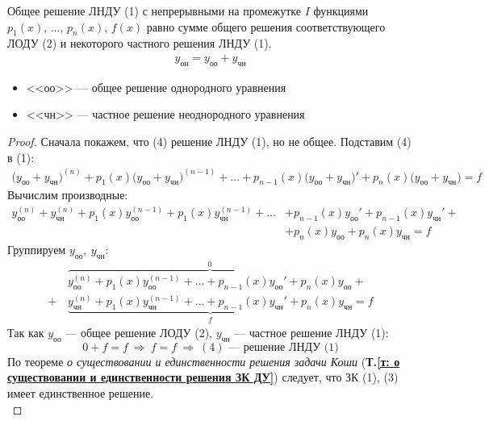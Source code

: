 \begin{theorem}
    Общее решение ЛНДУ (1) с непрерывными на промежутке $I$ функциями\break $p_1(x),\, \ldots,\, p_n(x),\, f(x)$ равно сумме общего решения соответствующего ЛОДУ (2) и некоторого частного решения ЛНДУ (1).
    \begin{gather}
        \boxed{y_{\text{он}} = y_{\text{оо}} + y_{\text{чн}}}
    \end{gather}
    \begin{itemize}
        \item <<оо>> --- общее решение однородного уравнения
        \item <<чн>> --- частное решение неоднородного уравнения
    \end{itemize}
\end{theorem}
\begin{proof}
    Сначала покажем, что (4) решение ЛНДУ (1), но не общее.
    Подставим (4) в (1):
    \begin{align*}
        \big(y_{\text{оо}} + y_{\text{чн}}\big)^{(n)} + p_1(x) \big(y_{\text{оо}} + y_{\text{чн}}\big)^{(n-1)} + \ldots + p_{n-1}(x) \big(y_{\text{оо}} + y_{\text{чн}}\big)' + p_n(x) \big(y_{\text{оо}} + y_{\text{чн}}\big) = f
    \end{align*}
    Вычислим производные:
    \begin{align*}
        y_{\text{оо}}^{(n)} + y_{\text{чн}}^{(n)} + p_1(x)y_{\text{оо}}^{(n-1)} + p_1(x) y_{\text{чн}}^{(n-1)} + \ldots &+ p_{n-1}(x)y_{\text{оо}}' + p_{n-1}(x) y_{\text{чн}}' + \\ 
        &+ p_{n}(x)y_{\text{оо}} + p_{n}(x) y_{\text{чн}} = f
    \end{align*}
    Группируем $y_{\text{оо}},\ y_{\text{чн}}\colon$
    \begin{align*}
        &\overbrace{y_{\text{оо}}^{(n)} + p_1(x)y_{\text{оо}}^{(n-1)} + \ldots + p_{n-1}(x)y_{\text{оо}}' + p_{n}(x)y_{\text{оо}}}^0 + \\ 
        +\, &\underbrace{y_{\text{чн}}^{(n)} + p_1(x) y_{\text{чн}}^{(n-1)} + \ldots  + p_{n-1}(x) y_{\text{чн}}' + p_{n}(x) y_{\text{чн}}}_f = f
    \end{align*}
    Так как $y_{\text{оо}}$ --- общее решение ЛОДУ (2), $y_{\text{чн}}$ --- частное решение ЛНДУ (1):
    \[
    0 + f = f\ \Rightarrow\ f = f\ \Rightarrow\ (4) \text{ --- решение ЛНДУ (1)}
    \]
    По теореме \textit{о существовании и единственности решения задачи Коши} (\textbf{Т.\ref{т: о существовании и единственности решения ЗК ДУ}}) следует, что ЗК (1), (3) имеет единственное решение.\\[1ex]

\end{proof}
